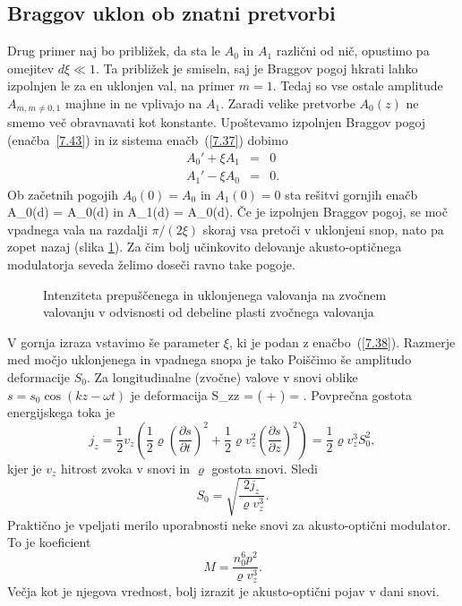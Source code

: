 \subsection*{Braggov uklon ob znatni pretvorbi}
Drug primer naj bo približek, da sta le $A_{0}$ in $A_{1}$ različni od nič, 
opustimo pa omejitev $d\xi\ll 1$. Ta približek je smiseln, saj je 
Braggov pogoj hkrati lahko izpolnjen le za en uklonjen val, na
primer $m=1$. Tedaj so vse ostale amplitude $A_{m, m\ne0,1}$
majhne in ne vplivajo na $A_{1}$. Zaradi velike pretvorbe 
$A_{0}(z)$ ne smemo več obravnavati kot konstante. Upoštevamo 
izpolnjen Braggov pogoj (enačba~\ref{7.43}) in iz sistema enačb~(\ref{7.37})
dobimo
\begin{eqnarray}
A_{0}'+\xi A_{1} & = & 0\nonumber \\
A_{1}'-\xi A_{0} & = & 0.
\end{eqnarray}
Ob začetnih pogojih $A_{0}(0)=A_{0}$ in $A_{1}(0)=0$ sta rešitvi gornjih enačb
\beq
A_{0}(d) = A_{0}\cos (\xi d)
\eeq
in
\beq
A_{1}(d) = A_{0}\sin (\xi d).
\eeq
Če je izpolnjen Braggov pogoj, se moč vpadnega vala na razdalji $\pi/(2\xi)$
skoraj vsa pretoči v uklonjeni snop, nato pa zopet nazaj (slika \ref{s7.10}).
Za čim bolj učinkovito delovanje akusto-optičnega modulatorja seveda
želimo doseči ravno take pogoje.
\begin{figure}[h]
\centering
\def\svgwidth{90truemm} 

\caption{Intenziteta prepuščenega in uklonjenega valovanja na zvočnem valovanju v
odvisnosti od debeline plasti zvočnega valovanja}
\label{s7.10}
\end{figure}

V gornja izraza vstavimo še parameter $\xi$, ki je podan z enačbo~(\ref{7.38}).
Razmerje med močjo uklonjenega in vpadnega snopa je tako
Poiščimo še amplitudo deformacije $S_0$. Za longitudinalne (zvočne) valove v snovi oblike 
$s = s_0 \cos(kz - \omega t)$ je deformacija 
\beq
S_{zz} = \bigl( + 
\bigr) = .
\eeq
Povprečna gostota energijskega toka je 
\begin{equation}
j_{z}=
\frac{1}{2}v_z \left(\frac{1}{2} \varrho \left(\frac{\partial s}{\partial t}\right)^2
+ \frac{1}{2} \varrho v_z^2\left(\frac{\partial s}{\partial z}\right)^2
\right) = \frac{1}{2} \varrho v_z^3 S_0^2,
\label{7.49}
\end{equation}
kjer je $v_z$ hitrost zvoka v snovi in $\varrho$ gostota snovi. Sledi 
\begin{equation}
S_{0}=\sqrt{\frac{2j_{z}}{\varrho v_{z}^{3}}}.
\label{7.50}
\end{equation}
Praktično je vpeljati merilo uporabnosti neke snovi za akusto-optični modulator. To je koeficient 
\begin{equation}
M=\frac{n_{0}^{6}p^{2}}{\varrho v_{z}^{3}}.
\label{7.51}
\end{equation}
Večja kot je njegova vrednost, bolj izrazit je akusto-optični pojav v dani snovi. 

